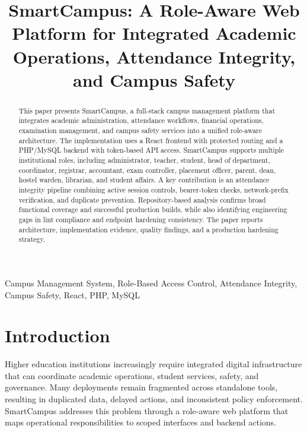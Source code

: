 \documentclass[conference]{IEEEtran}
\begin{document}
\title{SmartCampus: A Role-Aware Web Platform for Integrated Academic Operations, Attendance Integrity, and Campus Safety}

\author{
}

\maketitle

\begin{abstract}
This paper presents SmartCampus, a full-stack campus management platform that integrates academic administration, attendance workflows, financial operations, examination management, and campus safety services into a unified role-aware architecture. The implementation uses a React frontend with protected routing and a PHP/MySQL backend with token-based API access. SmartCampus supports multiple institutional roles, including administrator, teacher, student, head of department, coordinator, registrar, accountant, exam controller, placement officer, parent, dean, hostel warden, librarian, and student affairs. A key contribution is an attendance integrity pipeline combining active session controls, bearer-token checks, network-prefix verification, and duplicate prevention. Repository-based analysis confirms broad functional coverage and successful production builds, while also identifying engineering gaps in lint compliance and endpoint hardening consistency. The paper reports architecture, implementation evidence, quality findings, and a production hardening strategy.
\end{abstract}

\begin{IEEEkeywords}
Campus Management System, Role-Based Access Control, Attendance Integrity, Campus Safety, React, PHP, MySQL
\end{IEEEkeywords}

\section{Introduction}
Higher education institutions increasingly require integrated digital infrastructure that can coordinate academic operations, student services, safety, and governance. Many deployments remain fragmented across standalone tools, resulting in duplicated data, delayed actions, and inconsistent policy enforcement. SmartCampus addresses this problem through a role-aware web platform that maps operational responsibilities to scoped interfaces and backend actions.
\end{document}
